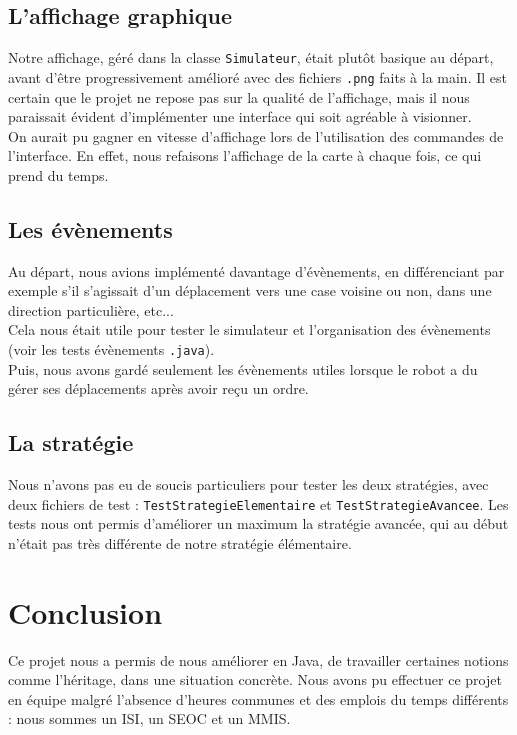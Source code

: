 \documentclass[12pt]{article}
\begin{document}
\subsection{L'affichage graphique}

Notre affichage, géré dans la classe {\tt Simulateur}, était plutôt basique au départ, avant d'être progressivement amélioré avec des fichiers {\tt .png} faits à la main. Il est certain que le projet ne repose pas sur la qualité de l'affichage, mais il nous paraissait évident d'implémenter une interface qui soit agréable à visionner.\\
On aurait pu gagner en vitesse d'affichage lors de l'utilisation des commandes de l'interface. En effet, nous refaisons l'affichage de la carte à chaque fois, ce qui prend du temps.

\subsection{Les évènements}

Au départ, nous avions implémenté davantage d'évènements, en différenciant par exemple s'il s'agissait d'un déplacement vers une case voisine ou non, dans une direction particulière, etc... \\
Cela nous était utile pour tester le simulateur et l'organisation des évènements (voir les tests évènements {\tt .java}).\\
Puis, nous avons gardé seulement les évènements utiles lorsque le robot a du gérer ses déplacements après avoir reçu un ordre.

\subsection{La stratégie}
Nous n'avons pas eu de soucis particuliers pour tester les deux stratégies, avec deux fichiers de test : {\tt TestStrategieElementaire} et {\tt TestStrategieAvancee}. Les tests nous ont permis d'améliorer un maximum la stratégie avancée, qui au début n'était pas très différente de notre stratégie élémentaire.


\section{Conclusion}

Ce projet nous a permis de nous améliorer en Java, de travailler certaines notions comme l'héritage, dans une situation concrète. Nous avons pu effectuer ce projet en équipe malgré l'absence d'heures communes et des emplois du temps différents : nous sommes un ISI, un SEOC et un MMIS.\\
\end{document}
